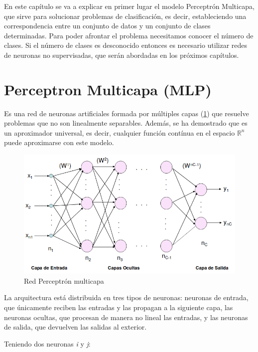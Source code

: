 \documentclass[11pt,spanish,listoffigures,listoftables]{workluis}
\begin{document}
\par En este capítulo se va a explicar en primer lugar el modelo Perceptrón Multicapa, que sirve para solucionar problemas de clasificación, es decir, estableciendo una correspondencia entre un conjunto de datos y un conjunto de clases determinadas. Para poder afrontar el problema necesitamos conocer el número de clases. Si el número de clases es desconocido entonces es necesario utilizar redes de neuronas no supervisadas, que serán abordadas en los próximos capítulos.

\section{Perceptron Multicapa (MLP)}

\par Es una red de neuronas artificiales formada por múltiples capas (\ref{fig:mlp}) que resuelve problemas que no son linealmente separables. Además, se ha demostrado que es un aproximador universal, es decir,  cualquier función contínua en el espacio $\mathbb{R}^n$ puede aproximarse con este modelo. 

\begin{figure}[H]
\centering
\includegraphics[scale=0.5]{mlp}
\caption{Red Perceptrón multicapa \cite{MLP}}\label{fig:mlp}
\end{figure}

\par La arquitectura está distribuida en tres tipos de neuronas: neuronas de entrada, que únicamente reciben las entradas y las propagan a la siguiente capa, las neuronas ocultas, que procesan de manera no lineal las entradas, y las neuronas de salida, que devuelven las salidas al exterior.

\par Teniendo dos neuronas \textit{i} y \textit{j}:
\end{document}
